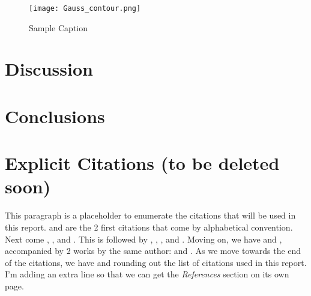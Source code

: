 \documentclass{article}
\begin{document}
\begin{figure}[ht]
    \centering
    \texttt{[image: Gauss\_contour.png]}
    \caption{Sample Caption}
\end{figure}




\section{Discussion}


\section{Conclusions}



\section{Explicit Citations (to be deleted soon)}
This paragraph is a placeholder to enumerate the citations that will be 
used in this report. \cite{Bruker} and \cite{Bunge} are the 2 first citations that 
come by alphabetical convention. Next come \cite{Callister}, \cite{Cox}, and \cite{Creuziger}. 
This is followed by \cite{Cullity}, \cite{Helmholtz}, \cite{Jacques}, and \cite{Matthies}. Moving 
on, we have \cite{Raabe} and \cite{Rizzie}, accompanied by 2 works by the same author: \cite{Rollett1} and \cite{Rollett2}. As 
we move towards the end of the citations, we have \cite{Schields} and \cite{Shackelford} rounding out the list of citations 
used in this report. I'm adding an extra line so that we can get the \textit{References} section on its own page.


\end{document}
